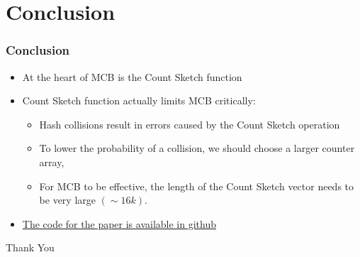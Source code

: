 \documentclass{beamer}
\begin{document}
\section{Conclusion} 
\begin{frame}
\frametitle{Conclusion}
\begin{itemize}
\item At the heart of MCB is the Count Sketch function
\item Count Sketch function actually limits MCB critically:
\begin{itemize}

\item  Hash collisions result in errors caused by the Count Sketch operation
\item To lower the probability of a collision, we should choose a larger counter array, 
\item For MCB to be effective, the length of the Count Sketch vector needs to be very large $(\sim16k)$.
\end{itemize}
\item \href{https://github.com/akirafukui/vqa-mcb}{The code for the paper is available in \color{blue}github} \color{black}
\end{itemize}
\end{frame}


\begin{frame}
\Huge{\centerline{Thank You}}
\end{frame}
\end{document}

